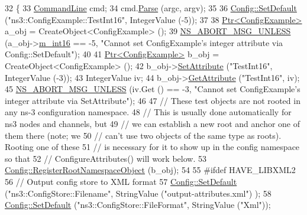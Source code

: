 \begin{DoxyCode}
32 \{
33   \hyperlink{classns3_1_1CommandLine}{CommandLine} cmd;
34   cmd.\hyperlink{classns3_1_1CommandLine_a5c10b85b3207e5ecb48d907966923156}{Parse} (argc, argv);
35   
36   \hyperlink{group__config_ga2e7882df849d8ba4aaad31c934c40c06}{Config::SetDefault} (\textcolor{stringliteral}{"ns3::ConfigExample::TestInt16"}, IntegerValue (-5));
37 
38   \hyperlink{classns3_1_1Ptr}{Ptr<ConfigExample>} a\_obj = CreateObject<ConfigExample> ();
39   \hyperlink{group__fatal_ga0bd3f62c55e7347ff814572f3aaa3864}{NS\_ABORT\_MSG\_UNLESS} (a\_obj->\hyperlink{classConfigExample_a6811c9cb03e7c3f04090bb1fd20861c0}{m\_int16} == -5, \textcolor{stringliteral}{"Cannot set ConfigExample's integer
       attribute via Config::SetDefault"});
40 
41   \hyperlink{classns3_1_1Ptr}{Ptr<ConfigExample>} b\_obj = CreateObject<ConfigExample> ();
42   b\_obj->\hyperlink{classns3_1_1ObjectBase_ac60245d3ea4123bbc9b1d391f1f6592f}{SetAttribute} (\textcolor{stringliteral}{"TestInt16"}, IntegerValue (-3));
43   IntegerValue iv;
44   b\_obj->\hyperlink{classns3_1_1ObjectBase_a895d1de2f96063d0e0fd78463e7a7e30}{GetAttribute} (\textcolor{stringliteral}{"TestInt16"}, iv);
45   \hyperlink{group__fatal_ga0bd3f62c55e7347ff814572f3aaa3864}{NS\_ABORT\_MSG\_UNLESS} (iv.Get () == -3, \textcolor{stringliteral}{"Cannot set ConfigExample's integer attribute
       via SetAttribute"});
46 
47   \textcolor{comment}{// These test objects are not rooted in any ns-3 configuration namespace.}
48   \textcolor{comment}{// This is usually done automatically for ns3 nodes and channels, but}
49   \textcolor{comment}{// we can establish a new root and anchor one of them there (note; we }
50   \textcolor{comment}{// can't use two objects of the same type as roots).  Rooting one of these}
51   \textcolor{comment}{// is necessary for it to show up in the config namespace so that}
52   \textcolor{comment}{// ConfigureAttributes() will work below.}
53   \hyperlink{group__config_gadf663c596f54bed678e83cccd4e3d9d5}{Config::RegisterRootNamespaceObject} (b\_obj);
54   
55 \textcolor{preprocessor}{#ifdef HAVE\_LIBXML2}
56   \textcolor{comment}{// Output config store to XML format}
57   \hyperlink{group__config_ga2e7882df849d8ba4aaad31c934c40c06}{Config::SetDefault} (\textcolor{stringliteral}{"ns3::ConfigStore::Filename"}, StringValue (\textcolor{stringliteral}{"output-attributes.xml"})
      );
58   \hyperlink{group__config_ga2e7882df849d8ba4aaad31c934c40c06}{Config::SetDefault} (\textcolor{stringliteral}{"ns3::ConfigStore::FileFormat"}, StringValue (\textcolor{stringliteral}{"Xml"}));

\end{DoxyCode}
